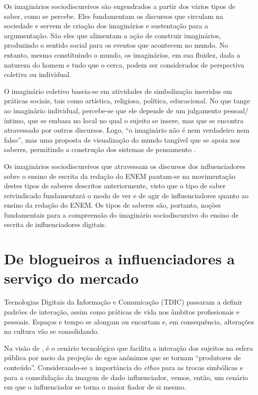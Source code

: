 \documentclass[portuguese]{textolivre}
\begin{document}
Os imaginários sociodiscursivos são engendrados a partir dos vários tipos de saber, como se percebe. Eles fundamentam os discursos que circulam na sociedade e servem de criação dos imaginários e sustentação para a argumentação. São eles que alimentam a ação de construir imaginários, produzindo o sentido social para os eventos que acontecem no mundo. No entanto, mesmo constituindo o mundo, os imaginários, em sua fluidez, dada a natureza do homem e tudo que o cerca, podem ser considerados de perspectiva coletiva ou individual. 

O imaginário coletivo baseia-se em atividades de simbolização inseridas em práticas sociais, tais como artística, religiosa, política, educacional. No que tange ao imaginário individual, percebe-se que ele depende de um julgamento pessoal/íntimo, que se embasa no local no qual o sujeito se insere, mas que se encontra atravessado por outros discursos. Logo, “o imaginário não é nem verdadeiro nem falso”, mas uma proposta de visualização do mundo tangível que se apoia nos saberes, permitindo a construção dos sistemas de pensamento \cite[p. 8]{charaudeau_os_2017}. 

Os imaginários sociodiscursivos que atravessam os discursos dos influenciadores sobre o ensino de escrita da redação do ENEM pautam-se na movimentação destes tipos de saberes descritos anteriormente, visto que o tipo de saber reivindicado  fundamentará o modo de ver e de agir de influenciadores quanto ao ensino da redação do ENEM. Os tipos de saberes são, portanto, noções fundamentais para a compreensão do imaginário sociodiscursivo do ensino de escrita de influenciadores digitais. 

\section{De blogueiros a influenciadores a serviço do mercado}\label{sec-fmt-manuscrito}
Tecnologias Digitais da Informação e Comunicação (TDIC) passaram a definir padrões de interação, assim como práticas de vida nos âmbitos profissionais e pessoais. Espaços e tempo se alongam ou encurtam e, em consequência, alterações na cultura vão se consolidando. 

Na visão de \textcite{karhawi_influenciadores_2017}, é o cenário tecnológico que facilita a interação dos sujeitos na esfera pública por meio da projeção de egos anônimos que se tornam “produtores de conteúdo”. Considerando-se a importância do \textit{ethos} para as trocas simbólicas \cite{maingueneau_proposito_2008} e para a consolidação da imagem de dado influenciador, vemos, então, um cenário em que o influenciador se torna o maior fiador de si mesmo.
\end{document}
